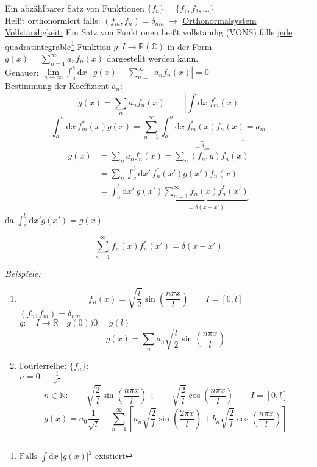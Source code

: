 \documentclass[titlepage,11pt,a4paper,ngerman]{report}
\newcommand{\tx}[1]{\textrm{#1}}
\newcommand{\dd}{\tx{d}}
\newcommand{\summ}[2]{\sum_{#1}^{#2}}
\newcommand{\intt}[2]{\int_{#1}^{#2}}
\newcommand{\frbox}[2]{\begin{tcolorbox}[colback=white,colframe=red!75!black,fonttitle=\bfseries,title=#1]#2\end{tcolorbox}}
\begin{document}
\noindent
Ein abzählbarer Satz von Funktionen $\{f_n\} = \{f_1, f_2, \dots \}$\\
Heißt orthonormiert falls: $(f_m,f_n) = \delta_{nm}\ \rightarrow$ \underline{Orthonormalsystem}\\
\underline{Vollständigkeit:} Ein Satz von Funktionen heißt vollständig (VONS) falls \underline{jede} quadratintegrable\footnote{$\textrm{Falls }\int \textrm{d}x\ |g(x)|^2 \textrm{ existiert}$} Funktion $g: I \to \mathbb R (\mathbb C)$ in der Form $g(x) = \summ{n = 1}{\infty} a_n f_n(x)$ dargestellt werden kann.\\
Genauer: $\lim\limits_{n \to \infty} \intt{a}{b} \textrm{d}x\ |\ g(x) - \summ{n = 1}{\infty} a_n f_n(x)| = 0$\\[5pt]
Bestimmung der Koeffizient $ a_n $:
$$g(x) = \sum_n a_n f_n(x)\ \qquad \left| \int \textrm{d}x\ f_m^*(x) \right.$$
$$\intt{a}{b}\textrm{d}x\ f_m^* (x) g(x) = \summ{n = 1}{\infty} \underbrace{\intt{a}{b} \textrm{d}x\ f_m^* (x)f_n(x)}_{= \delta_{nm}} = a_m$$
\begin{align*}
 	g(x) &= \sum_n a_n f_n (x) = \sum_n (f_n,g)f_n(x)\\
 	&= \sum_n \intt{a}{b} \textrm{d}x'\ f_n^* (x') g(x') f_n(x)\\
 	&= \intt{a}{b} \textrm{d}x'\ g(x') \underbrace{\summ{n = 1}{\infty} f_n(x)f_n^*(x')}_{= \delta(x - x')}
\end{align*}
da $ \int_{a}^{b} \dd x' g(x') = g(x) $
\frbox{Vollständigkeitsrelation}{$$\summ{n = 1}{\infty}f_n(x)f_n^*(x') = \delta(x - x')$$}
\noindent
\emph{Beispiele:}
\begin{enumerate}[1)]
	\item 
	\begin{equation*}
	f_n(x) = \sqrt{\frac{l}{2}} \sin\left(\frac{n \pi x}{l}\right) \qquad I = [0,l] 
	\end{equation*}
	$ (f_n,f_m) = \delta_{nm} $\\
	$ g: \quad I \rightarrow \mathbb{R} \quad g(0) ) 0 = g(l) $
	\begin{equation*}
	g(x) = \sum_{n} a_n \sqrt{\frac{l}{2}} \sin \left(\frac{n \pi x}{l}\right)
	\end{equation*}
	\item Fourierreihe: $ \{f_n\} $:\\
	$ n=0: \quad \frac{1}{\sqrt{l}} $
	\begin{equation*}
	n \in \mathbb{N}: \qquad \sqrt{\frac{2}{l}} \sin \left(\frac{n \pi x}{l}\right) \ \ ; \qquad \sqrt{\frac{2}{l}} \cos\left(\frac{n \pi x}{l}\right) \qquad I = [0,l]
	\end{equation*}
	\begin{equation*}
	g(x) = a_0 \frac{1}{\sqrt{l}} + \sum_{n=1}^{\infty} \left[a_n \sqrt{\frac{2}{l}} \sin \left(\frac{2 \pi x}{l}\right) + b_n \sqrt{\frac{2}{l}} \cos\left(\frac{n \pi x}{l}\right)\right]
	\end{equation*}
	\vspace{5pt}
\end{enumerate}
\end{document}
